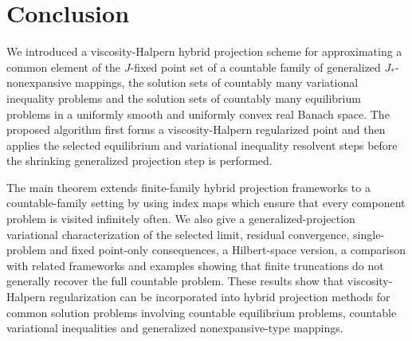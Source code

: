 \documentclass[leqno,12pt]{amsart}
\theoremstyle{definition}
\numberwithin{equation}{section}
\begin{document}
\section{Conclusion}

We introduced a viscosity-Halpern hybrid projection scheme for approximating a common element of the $J$-fixed point set of a countable family of generalized $J_{*}$-nonexpansive mappings, the solution sets of countably many variational inequality problems and the solution sets of countably many equilibrium problems in a uniformly smooth and uniformly convex real Banach space. The proposed algorithm first forms a viscosity-Halpern regularized point and then applies the selected equilibrium and variational inequality resolvent steps before the shrinking generalized projection step is performed.

The main theorem extends finite-family hybrid projection frameworks to a countable-family setting by using index maps which ensure that every component problem is visited infinitely often. We also give a generalized-projection variational characterization of the selected limit, residual convergence, single-problem and fixed point-only consequences, a Hilbert-space version, a comparison with related frameworks and examples showing that finite truncations do not generally recover the full countable problem. These results show that viscosity-Halpern regularization can be incorporated into hybrid projection methods for common solution problems involving countable equilibrium problems, countable variational inequalities and generalized nonexpansive-type mappings.
\end{document}
